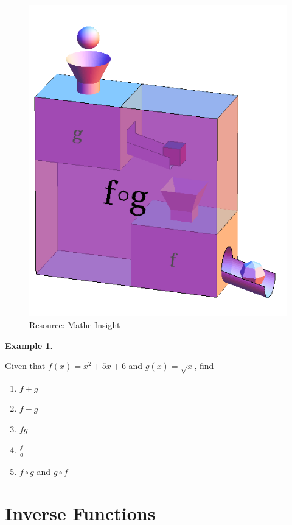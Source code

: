 \documentclass[
]{book}
\providecommand{\tightlist}{%
  \setlength{\itemsep}{0pt}\setlength{\parskip}{0pt}}
\theoremstyle{definition}
\theoremstyle{definition}
\newtheorem{example}{Example}[chapter]
\theoremstyle{definition}
\theoremstyle{definition}
\theoremstyle{remark}
\begin{document}
\begin{figure}
\centering
\includegraphics{fig/fig12.png}
\caption{Resource: Mathe Insight}
\end{figure}

\begin{example}
\protect\hypertarget{exm:unnamed-chunk-6}{}\label{exm:unnamed-chunk-6}

Given that \(f(x) = x^2 + 5x + 6\) and \(g(x) = \sqrt{x}\), find

\begin{enumerate}
\def\labelenumi{\roman{enumi}.}
\tightlist
\item
  \(f + g\)
\item
  \(f - g\)
\item
  \(fg\)
\item
  \(\frac{f}{g}\)
\item
  \(f \circ g\) and \(g \circ f\)
\end{enumerate}

\end{example}

\section{Inverse Functions}\label{inverse-functions}
\end{document}
